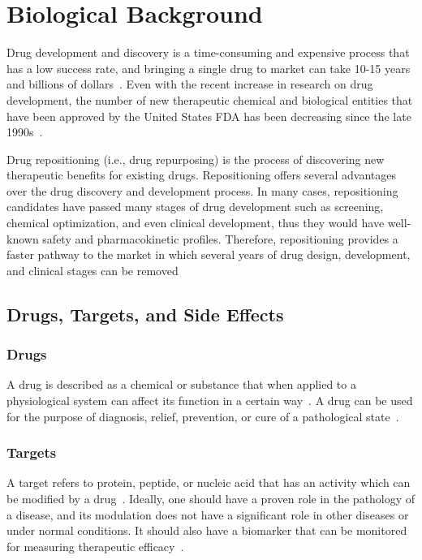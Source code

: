 \chapter{Biological Background}
\label{ch:biological}

Drug development and discovery is a time-consuming and expensive process that has a low success rate, and bringing a single drug to market can take 10-15 years and billions of dollars~\cite{arrowsmith_phase_2011, arrowsmith_phase_2013}.
Even with the recent increase in research on drug development, the number of new therapeutic chemical and biological entities that have been approved by the United States \ac{FDA} has been decreasing since the late 1990s~\cite{wang_exploring_2014}.

Drug repositioning (i.e., drug repurposing) is the process of discovering new therapeutic benefits for existing drugs.
Repositioning offers several advantages over the drug discovery and development process.
In many cases, repositioning candidates have passed many stages of drug development such as screening, chemical optimization, and even clinical development, thus they would have well-known safety and pharmacokinetic profiles.
Therefore, repositioning provides a faster pathway to the market in which several years of drug design, development, and clinical stages can be removed~\cite{ashburn_drug_2004}

\section{Drugs, Targets, and Side Effects}

\subsection{Drugs}

A drug is described as a chemical or substance that when applied to a physiological system can affect its function in a certain way~\cite{rang_rang_2014}.
A drug can be used for the purpose of diagnosis, relief, prevention, or cure of a pathological state~\cite{satoskar_pharmacology_1973}.

\subsection{Targets}

A target refers to protein, peptide, or nucleic acid that has an activity which can be modified by a drug~\cite{gashaw_what_2011}.
Ideally, one should have a proven role in the pathology of a disease, and its modulation does not have a significant role in other diseases or under normal conditions.
It should also have a biomarker that can be monitored for measuring therapeutic efficacy~\cite{gashaw_what_2011}.

